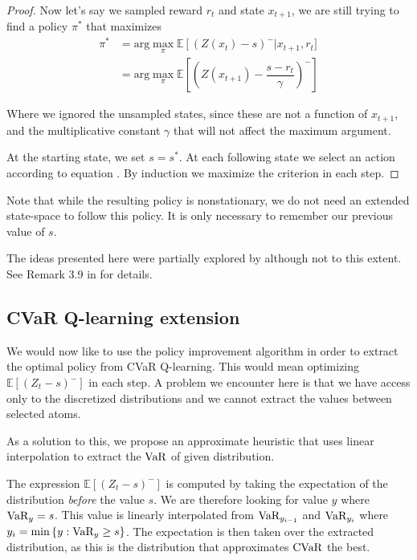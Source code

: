 \begin{proof}
Now let's say we sampled reward $r_t$ and state $x_{t+1}$, we are still trying to find a policy $\pi^*$ that maximizes 
\begin{equation}\label{eqn:sampled x_t+1}
\begin{split}
\pi^* &=\text{arg}\max_\pi \mathbb{E}\left[(Z(x_t)-s)^-\right | x_{t+1}, r_t]\\
&= \text{arg}\max_\pi \mathbb{E}\left[\left(Z(x_{t+1}) - \dfrac{s - r_t}{\gamma}\right)^-\right]
\end{split}
\end{equation}

Where we ignored the unsampled states, since these are not a function of $x_{t+1}$, and the multiplicative constant $\gamma$ that will not affect the maximum argument.

At the starting state, we set $s=s^*$. At each following state we select an action according to equation . By induction we maximize the criterion  in each step.
\end{proof}

Note that while the resulting policy is nonstationary, we do not need an extended state-space to follow this policy. It is only necessary to remember our previous value of $s$.

The ideas presented here were partially explored by \citet{bauerle2011markov} although not to this extent. See Remark 3.9 in \citep{bauerle2011markov} for details.

\subsection{CVaR Q-learning extension}
We would now like to use the policy improvement algorithm in order to extract the optimal policy from CVaR Q-learning. This would mean optimizing $\mathbb{E}\left[(Z_t-s)^-\right]$ in each step. A problem we encounter here is that we have access only to the discretized distributions and we cannot extract the values between selected atoms.

As a solution to this, we propose an approximate heuristic that uses linear interpolation to extract the $\text{VaR}$ of given distribution. 

The expression $\mathbb{E}\left[(Z_t-s)^-\right]$ is computed by taking the expectation of the distribution \textit{before} the value $s$. We are therefore looking for value $y$ where $\text{VaR}_y=s$. This value is linearly interpolated from $\text{VaR}_{y_{i-1}}$ and $\text{VaR}_{y_{i}}$ where $y_i=\min \left\{ {y: \text{VaR}_y \ge s} \right\}$. The expectation is then taken over the extracted distribution, as this is the distribution that approximates $\text{CVaR}$ the best.

